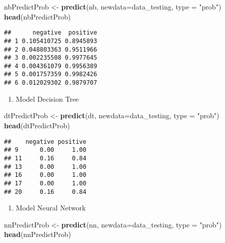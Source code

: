 \documentclass[]{article}
\newenvironment{Shaded}{\begin{snugshade}}{\end{snugshade}}
\newcommand{\DataTypeTok}[1]{\textcolor[rgb]{0.13,0.29,0.53}{#1}}
\newcommand{\KeywordTok}[1]{\textcolor[rgb]{0.13,0.29,0.53}{\textbf{#1}}}
\newcommand{\NormalTok}[1]{#1}
\newcommand{\StringTok}[1]{\textcolor[rgb]{0.31,0.60,0.02}{#1}}
\providecommand{\tightlist}{%
  \setlength{\itemsep}{0pt}\setlength{\parskip}{0pt}}
\begin{document}
\begin{Shaded}
\begin{Highlighting}[]
\NormalTok{nbPredictProb <-}\StringTok{ }\KeywordTok{predict}\NormalTok{(nb, }\DataTypeTok{newdata=}\NormalTok{data_testing, }\DataTypeTok{type =} \StringTok{"prob"}\NormalTok{)}
\KeywordTok{head}\NormalTok{(nbPredictProb)}
\end{Highlighting}
\end{Shaded}

\begin{verbatim}
##      negative  positive
## 1 0.105410725 0.8945893
## 2 0.048803363 0.9511966
## 3 0.002235508 0.9977645
## 4 0.004361079 0.9956389
## 5 0.001757359 0.9982426
## 6 0.012029302 0.9879707
\end{verbatim}

\begin{enumerate}
\def\labelenumi{\arabic{enumi}.}
\setcounter{enumi}{1}
\tightlist
\item
  Model Decision Tree
\end{enumerate}

\begin{Shaded}
\begin{Highlighting}[]
\NormalTok{dtPredictProb <-}\StringTok{ }\KeywordTok{predict}\NormalTok{(dt, }\DataTypeTok{newdata=}\NormalTok{data_testing, }\DataTypeTok{type =} \StringTok{"prob"}\NormalTok{)}
\KeywordTok{head}\NormalTok{(dtPredictProb)}
\end{Highlighting}
\end{Shaded}

\begin{verbatim}
##    negative positive
## 9      0.00     1.00
## 11     0.16     0.84
## 13     0.00     1.00
## 16     0.00     1.00
## 17     0.00     1.00
## 20     0.16     0.84
\end{verbatim}

\begin{enumerate}
\def\labelenumi{\arabic{enumi}.}
\setcounter{enumi}{2}
\tightlist
\item
  Model Neural Network
\end{enumerate}

\begin{Shaded}
\begin{Highlighting}[]
\NormalTok{nnPredictProb <-}\StringTok{ }\KeywordTok{predict}\NormalTok{(nn, }\DataTypeTok{newdata=}\NormalTok{data_testing, }\DataTypeTok{type =} \StringTok{"prob"}\NormalTok{)}
\KeywordTok{head}\NormalTok{(nnPredictProb)}
\end{Highlighting}
\end{Shaded}
\end{document}

